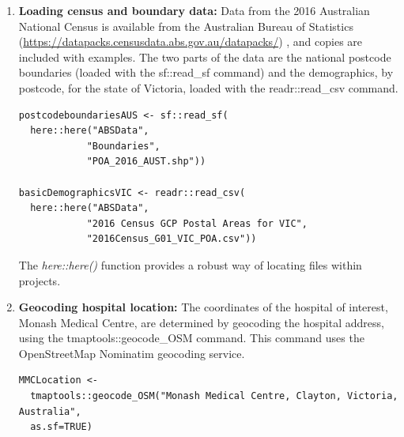\documentclass[utf8]{frontiersHLTH}
\begin{document}
\begin{table}[h]
\begin{center}
\begin{mdframed}[backgroundcolor=blue!20]
  \sffamily
  \tiny
\begin{enumerate}
\def\labelenumi{\arabic{enumi}.}
\item
  {\bf Loading census and boundary data:} Data from the 2016 Australian
  National Census is available from the Australian Bureau of Statistics
  (\url{https://datapacks.censusdata.abs.gov.au/datapacks/}) , and
  copies are included with examples. The two parts of the data are the
  national postcode boundaries (loaded with the sf::read\_sf command)
  and the demographics, by postcode, for the state of Victoria, loaded
  with the readr::read\_csv command.
\begin{lstlisting}
postcodeboundariesAUS <- sf::read_sf(
  here::here("ABSData", 
            "Boundaries", 
            "POA_2016_AUST.shp"))

basicDemographicsVIC <- readr::read_csv(
  here::here("ABSData", 
            "2016 Census GCP Postal Areas for VIC", 
            "2016Census_G01_VIC_POA.csv"))
\end{lstlisting}
The {\em here::here()} function provides a robust way of locating files within projects.
\item
  {\bf Geocoding hospital location:} The coordinates of the hospital of
  interest, Monash Medical Centre, are determined by geocoding the
  hospital address, using the tmaptools::geocode\_OSM command. This
  command uses the OpenStreetMap Nominatim geocoding service.
\begin{lstlisting}
MMCLocation <- 
  tmaptools::geocode_OSM("Monash Medical Centre, Clayton, Victoria, Australia", 
  as.sf=TRUE)


\end{lstlisting}
\end{enumerate}
\end{mdframed}
\end{center}
\end{table}
\end{document}
